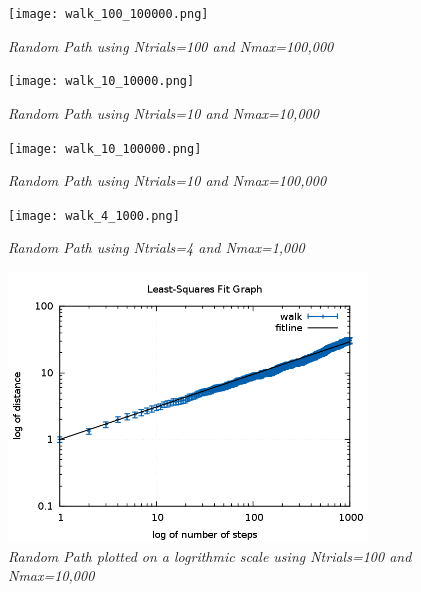 \documentclass[11pt]{article}
\begin{document}
\begin{figure}[H]
  \begin{center}
\centerline{\texttt{[image: walk\_100\_100000.png]}}
\caption{\it \small{Random Path using Ntrials=100 and Nmax=100,000 \label{fig4}}}
  \end{center}
\end{figure}

\begin{figure}[H]
  \begin{center}
\centerline{\texttt{[image: walk\_10\_10000.png]}}
\caption{\it \small{Random Path using Ntrials=10 and Nmax=10,000 \label{fig2}}}
  \end{center}
\end{figure}

\begin{figure}[H]
  \begin{center}
\centerline{\texttt{[image: walk\_10\_100000.png]}}
\caption{\it \small{Random Path using Ntrials=10 and Nmax=100,000 \label{fig3}}}
  \end{center}
\end{figure}

\begin{figure}[H]
  \begin{center}
\centerline{\texttt{[image: walk\_4\_1000.png]}}
\caption{\it \small{Random Path using Ntrials=4 and Nmax=1,000 \label{fig5}}}
  \end{center}
\end{figure}

\begin{figure}[H]
  \begin{center}
\centerline{\includegraphics[width=3.75in]{logleastsquaresfit.png}}
\caption{\it \small{Random Path plotted on a logrithmic scale using Ntrials=100 and Nmax=10,000 \label{fig6}}}
  \end{center}
\end{figure}
\end{document}
